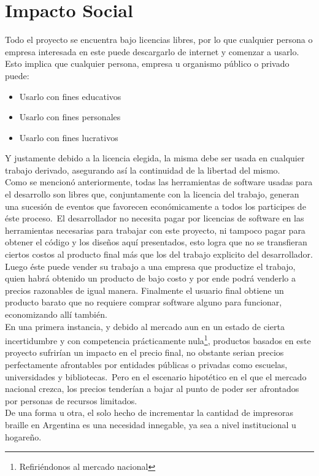 \chapter{Impacto Social}

Todo el proyecto se encuentra bajo licencias libres, por lo que cualquier
persona o empresa interesada en este puede descargarlo de internet y
comenzar a usarlo. Esto implica que cualquier persona, empresa u organismo
p\'ublico o privado puede:

\begin{itemize}
 \item Usarlo con fines educativos
 \item Usarlo con fines personales
 \item Usarlo con fines lucrativos
\end{itemize}

Y justamente debido a la licencia elegida, la misma debe ser usada en cualquier
trabajo derivado, asegurando as\'i la continuidad de la libertad del mismo.\\

Como se mencion\'o anteriormente, todas las herramientas de software usadas
para el desarrollo son libres que, conjuntamente con la licencia del trabajo,
generan una sucesi\'on de eventos que favorecen econ\'omicamente a todos los
participes de \'este proceso.\
El desarrollador no necesita pagar por licencias de software en las
herramientas necesarias para trabajar con este proyecto, ni tampoco pagar para
obtener el c\'odigo y los dise\~nos aqu\'i presentados, esto logra que no se
transfieran ciertos costos al producto final m\'as que los del trabajo
explicito
del desarrollador. Luego \'este puede vender su trabajo a una empresa que
productize el trabajo, quien habr\'a obtenido un producto de bajo costo y por
ende podr\'a venderlo a precios razonables de igual manera. Finalmente el
usuario final obtiene un producto barato que no requiere comprar software
alguno para funcionar, economizando all\'i tambi\'en.\\

En una primera instancia, y debido al mercado aun en un estado de cierta
incertidumbre y con competencia pr\'acticamente nula\footnote{Refiri\'endonos
al
mercado nacional}, productos basados en este proyecto sufrir\'ian un impacto en
el precio final, no obstante serian precios perfectamente afrontables por
entidades p\'ublicas o privadas como escuelas, universidades y bibliotecas.\ 
Pero en el escenario hipot\'etico en el que el mercado nacional crezca, los
precios tender\'ian a bajar al punto de poder ser afrontados por personas de
recursos limitados.\\ 

De una forma u otra, el solo hecho de incrementar la cantidad de impresoras
braille en Argentina es una necesidad innegable, ya sea a nivel institucional u
hogare\~no.\\